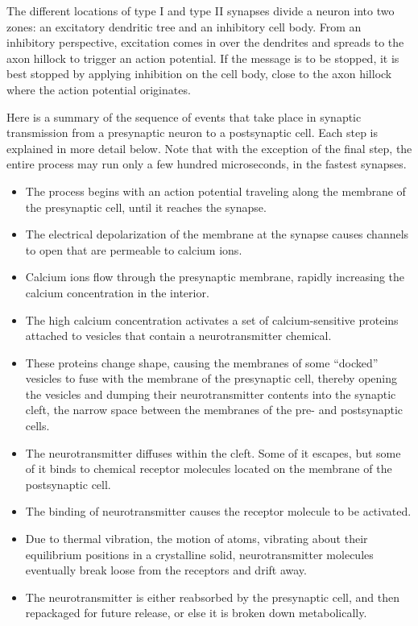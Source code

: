 The different locations of type I and type II synapses divide a neuron into two zones: an excitatory dendritic tree and an inhibitory cell body. From an inhibitory perspective, excitation comes in over the dendrites and spreads to the axon hillock to trigger an action potential. If the message is to be stopped, it is best stopped by applying inhibition on the cell body, close to the axon hillock where the action potential originates.

Here is a summary of the sequence of events that take place in synaptic transmission from a presynaptic neuron to a postsynaptic cell. Each step is explained in more detail below. Note that with the exception of the final step, the entire process may run only a few hundred microseconds, in the fastest synapses.

\begin{itemize}
\tightlist
\item
  The process begins with an action potential traveling along the membrane of the presynaptic cell, until it reaches the synapse.
\item
  The electrical depolarization of the membrane at the synapse causes channels to open that are permeable to calcium ions.
\item
  Calcium ions flow through the presynaptic membrane, rapidly increasing the calcium concentration in the interior.
\item
  The high calcium concentration activates a set of calcium-sensitive proteins attached to vesicles that contain a neurotransmitter chemical.
\item
  These proteins change shape, causing the membranes of some ``docked'' vesicles to fuse with the membrane of the presynaptic cell, thereby opening the vesicles and dumping their neurotransmitter contents into the synaptic cleft, the narrow space between the membranes of the pre- and postsynaptic cells.
\item
  The neurotransmitter diffuses within the cleft. Some of it escapes, but some of it binds to chemical receptor molecules located on the membrane of the postsynaptic cell.
\item
  The binding of neurotransmitter causes the receptor molecule to be activated.
\item
  Due to thermal vibration, the motion of atoms, vibrating about their equilibrium positions in a crystalline solid, neurotransmitter molecules eventually break loose from the receptors and drift away.
\item
  The neurotransmitter is either reabsorbed by the presynaptic cell, and then repackaged for future release, or else it is broken down metabolically.
\end{itemize}

